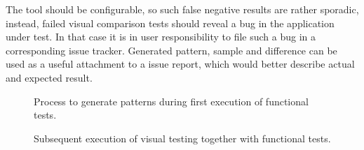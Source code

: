 \documentclass[11pt,oneside,final]{fithesis2}
\begin{document}
  The tool should be configurable, so such false negative results are rather sporadic, instead, failed visual comparison tests should reveal a bug in the application under test. In that case
  it is in user responsibility to file such a bug in a corresponding issue tracker. Generated pattern, sample and difference can be used as a useful attachment to a issue report, which
  would better describe actual and expected result.
  
   \begin{figure}[!htb]
    \begin{center}
    \leavevmode
    \centerline{}
    \end{center}
    \caption{Process to generate patterns during first execution of functional tests.}
    \label{fig:FirstTestsRunBMPN}
  \end{figure}
  
  \begin{figure}[!htb]
    \begin{center}
    \leavevmode
    \centerline{}
    \end{center}
    \caption{Subsequent execution of visual testing together with functional tests.}
    \label{fig:NextTestsRunsBMPN}
  \end{figure}
  
\end{document}

